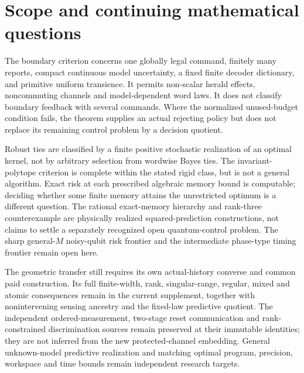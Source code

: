 \section{Scope and continuing mathematical questions}\label{sec:r67-scope}
The boundary criterion concerns one globally legal command, finitely many reports, compact continuous model uncertainty, a fixed finite decoder dictionary, and primitive uniform transience. It permits non-scalar herald effects, noncommuting channels and model-dependent word laws. It does not classify boundary feedback with several commands. Where the normalized unused-budget condition fails, the theorem supplies an actual rejecting policy but does not replace its remaining control problem by a decision quotient.

Robust ties are classified by a finite positive stochastic realization of an optimal kernel, not by arbitrary selection from wordwise Bayes ties. The invariant-polytope criterion is complete within the stated rigid class, but is not a general algorithm. Exact risk at each prescribed algebraic memory bound is computable; deciding whether some finite memory attains the unrestricted optimum is a different question. The rational exact-memory hierarchy and rank-three counterexample are physically realized squared-prediction constructions, not claims to settle a separately recognized open quantum-control problem. The sharp general-$M$ noisy-qubit risk frontier and the intermediate phase-type timing frontier remain open here.

The geometric transfer still requires its own actual-history converse and common paid construction. Its full finite-width, rank, singular-range, regular, mixed and atomic consequences remain in the current supplement, together with nonintervening sensing ancestry and the fixed-law predictive quotient. The independent ordered-measurement, two-stage reset communication and rank-constrained discrimination sources remain preserved at their immutable identities; they are not inferred from the new protected-channel embedding. General unknown-model predictive realization and matching optimal program, precision, workspace and time bounds remain independent research targets.


